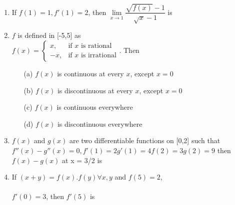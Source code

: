 \documentclass[journal,12pt,twocolumn]{IEEEtran}
\begin{document}
\begin{enumerate}
\item If $f(1)=1, f'(1)=2$, then $\lim\limits_{x \to 1}\dfrac{\sqrt{f(x)}-1}{\sqrt{x}-1}$ is
\begin{itemize}
\end{itemize}

\item$f$ is defined in [-5,5] as\\
$f(x)=\begin{cases}
x, & \text{if $x$ is rational}\\
-x, & \text{if $x$ is irrational}
\end{cases}$. Then
\begin{itemize}
\item[(a)] $f(x)$ is continuous at every $x$, except $x=0$
\item[(b)] $f(x)$ is discontinuous at every $x$, except $x=0$
\item[(c)] $f(x)$ is continuous everywhere
\item[(d)] $f(x)$ is discontinuous everywhere\\
\end{itemize}

\item$f(x)$ and $g(x)$ are two differentiable functions on [0,2] such that $f''(x)-g''(x)=0, f'(1)=2g'(1)=4f(2)=3g(2)=9$ then $f(x)-g(x)$ at x = 3/2 is
\begin{itemize}
\end{itemize}

\item If $(x+y)=f(x).f(y) \forall x, y$ and $f(5)=2$, \\ \\$f'(0)=3$, then $f'(5)$ is
\begin{itemize}
\end{itemize}


\end{enumerate}
\end{document}
